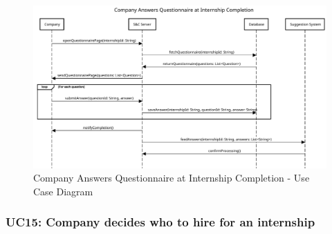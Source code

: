 \begin{figure}[H]
    \centering
    \includegraphics[width=1.0\textwidth]{Images/UC_14.pdf}
    \caption{Company Answers Questionnaire at Internship Completion - Use Case Diagram}
    \label{fig:use-case-diagram-14}
\end{figure}

\pagebreak


\subsubsection{UC15: Company decides who to hire for an internship}
\label{subsubsec:company-decides-who-to-hire-for-an-internship}

